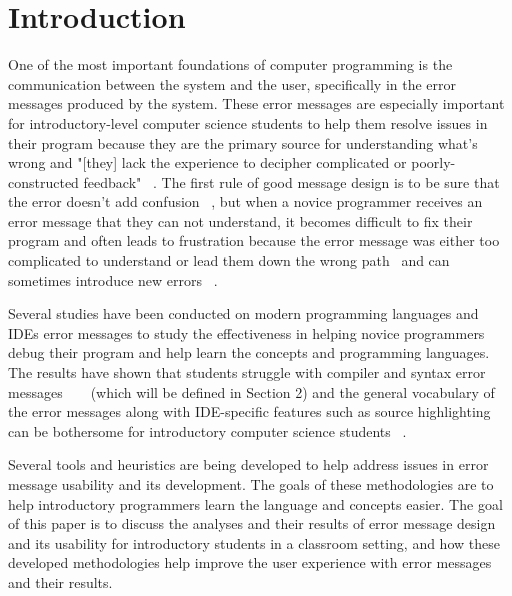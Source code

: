 \documentclass{sig-alternate}
\begin{document}


\section{Introduction}\label{intro}
One of the most important foundations of computer programming is the communication between the system and the user, specifically in the error messages produced by the system. These error messages are especially important for introductory-level computer science students to help them resolve issues in their program because they are the primary source for understanding what's wrong and "[they] lack the experience to decipher complicated or poorly-constructed feedback" ~\cite{Marceau:2011:MEE:1953163.1953308}. The first rule of good message design is to be sure that the error doesn't add confusion ~\cite{Isa:1983:MOE:800045.801583}, but when a novice programmer receives an error message that they can not understand, it becomes difficult to fix their program and often leads to frustration because the error message was either too complicated to understand or lead them down the wrong path~\cite{Marceau:2011:MYL:2048237.2048241} and can sometimes introduce new errors ~\cite{Denny:2014:ESE:2591708.2591748}. 

Several studies have been conducted on modern programming languages and IDEs error messages to study the effectiveness in helping novice programmers debug their program and help learn the concepts and programming languages. The results have shown that students struggle with compiler and syntax error messages ~\cite{Denny:2014:ESE:2591708.2591748} ~\cite{Traver:2010} (which will be defined in Section 2) and the general vocabulary of the error messages along with IDE-specific features such as source highlighting can be bothersome for introductory computer science students ~\cite{Marceau:2011:MYL:2048237.2048241}. 

Several tools and heuristics are being developed to help address issues in error message usability and its development. The goals of these methodologies are to help introductory programmers learn the language and concepts easier. The goal of this paper is to discuss the analyses and their results of error message design and its usability for introductory students in a classroom setting, and how these developed methodologies help improve the user experience with error messages and their results. 
\end{document}
